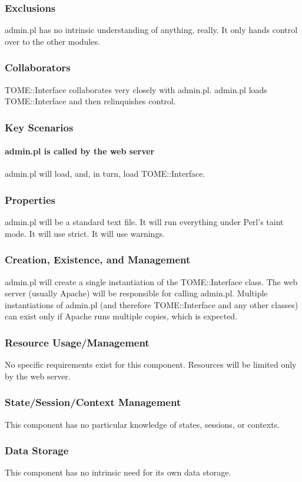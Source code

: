 \documentclass[12pt,titlepage]{article}
\begin{document}
\subsubsection{Exclusions}
admin.pl has no intrinsic understanding of anything, really.  It only hands control over to the other modules.
\subsubsection{Collaborators}
TOME::Interface collaborates very closely with admin.pl.  admin.pl loads TOME::Interface and then relinquishes control.
\subsubsection{Key Scenarios}
\paragraph{admin.pl is called by the web server}
admin.pl will load, and, in turn, load TOME::Interface.
\subsubsection{Properties}
admin.pl will be a standard text file.  It will run everything under Perl's taint mode.  It will use strict.  It will use warnings. 
\subsubsection{Creation, Existence, and Management}
admin.pl will create a single instantiation of the TOME::Interface class.  The web server (usually Apache) will be responsible for calling admin.pl.  Multiple instantiations of admin.pl (and therefore TOME::Interface and any other classes) can exist only if Apache runs multiple copies, which is expected.
\subsubsection{Resource Usage/Management}
No specific requirements exist for this component.  Resources will be limited only by the web server.
\subsubsection{State/Session/Context Management}
This component has no particular knowledge of states, sessions, or contexts.
\subsubsection{Data Storage}
This component has no intrinsic need for its own data storage.
\end{document}
